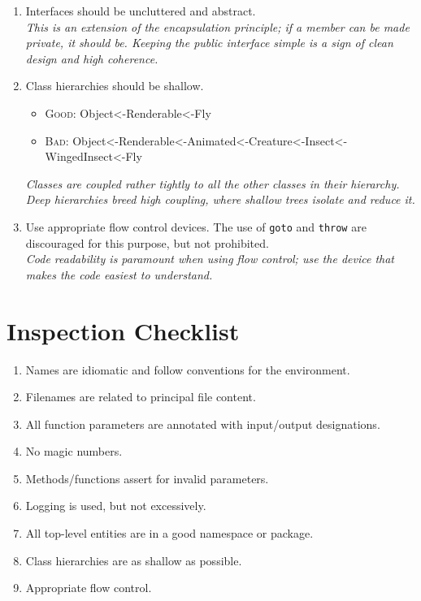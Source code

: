 \documentclass[11pt]{article}
\begin{document}
\begin{enumerate}
\item Interfaces should be uncluttered and abstract.
  \\ {\it This is an extension of the encapsulation principle; if a member can be made private, it
    should be.  Keeping the public interface simple is a sign of clean design and high coherence. }

\item Class hierarchies should be shallow.
  \begin{itemize}
  \item \textsc{Good:} Object<-Renderable<-Fly
  \item \textsc{Bad:} Object<-Renderable<-Animated<-Creature<-Insect<-WingedInsect<-Fly
  \end{itemize}
  {\it Classes are coupled rather tightly to all the other classes in their hierarchy.  Deep
    hierarchies breed high coupling, where shallow trees isolate and reduce it. }

\item Use appropriate flow control devices.  The use of \texttt{goto} and \texttt{throw} are
  discouraged for this purpose, but not prohibited.
  \\ {\it Code readability is paramount when using flow control; use the device that makes the code
    easiest to understand. }

\end{enumerate}



\clearpage
\section{Inspection Checklist}

\begin{enumerate}[\ensuremath{\square}]
  \item Names are idiomatic and follow conventions for the environment.
  \item Filenames are related to principal file content.
  \item All function parameters are annotated with input/output designations.
  \item No magic numbers.
  \item Methods/functions assert for invalid parameters.
  \item Logging is used, but not excessively.
  \item All top-level entities are in a good namespace or package.
  \item Class hierarchies are as shallow as possible.
  \item Appropriate flow control.
\end{enumerate}
\end{document}
